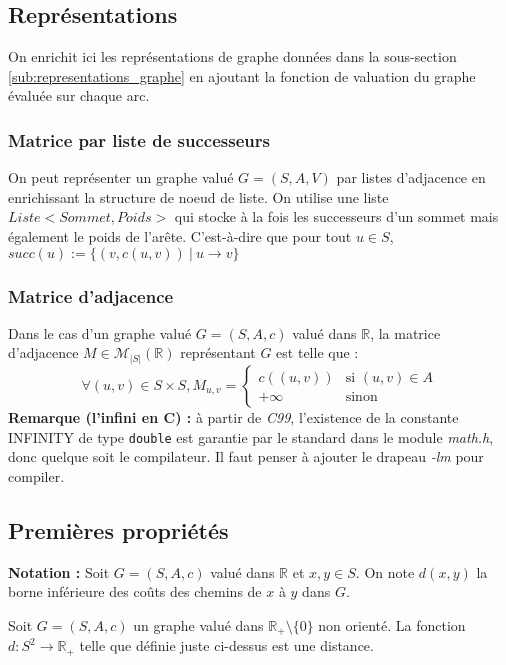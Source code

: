 \documentclass[../../../main.tex]{subfiles}
\begin{document}
\subsection{Représentations}
On enrichit ici les représentations de graphe données dans la sous-section \ref{sub:representations_graphe} en ajoutant la fonction de valuation du graphe évaluée sur chaque arc.
\subsubsection{Matrice par liste de successeurs}
On peut représenter un graphe valué $G = (S, A, V)$ par listes d'adjacence en enrichissant la structure de noeud de liste. On utilise une liste $Liste<Sommet, Poids>$ qui stocke à la fois les successeurs d'un sommet mais également le poids de l'arête. C'est-à-dire que pour tout $u\in S$, $succ(u) := \{(v, c(u, v))\ |\ u\rightarrow v\}$
\subsubsection{Matrice d'adjacence}
Dans le cas d'un graphe valué $G = (S, A, c)$ valué dans $\mathbb{R}$, la matrice d'adjacence $M\in\mathcal{M}_{|S|}(\mathbb{R})$ représentant $G$ est telle que :
$$\forall (u, v)\in S\times S, M_{u, v} = \left\{\begin{array}{ll}
c((u, v)) & \text{si } (u, v)\in A \\
+\infty & \text{sinon}
\end{array}\right.$$
\textbf{Remarque (l'infini en C) :} à partir de \textit{C99}, l'existence de la constante \textsf{INFINITY} de type \texttt{double}
est garantie par le standard dans le module \textit{math.h}, donc quelque soit le compilateur. Il faut penser à
ajouter le drapeau \textit{-lm} pour compiler.
\subsection{Premières propriétés}
\textbf{Notation :} Soit $G = (S, A, c)$ valué dans $\mathbb{R}$ et $x, y\in S$. On note $d(x, y)$ la borne inférieure des coûts
des chemins de $x$ à $y$ dans $G$.

 Soit $G = (S, A, c)$ un graphe valué dans $\mathbb{R}_+\setminus{\{0\}}$ non orienté. La
fonction $d : S^2\rightarrow \mathbb{R}_+$ telle que définie juste ci-dessus est une distance.
\end{document}
